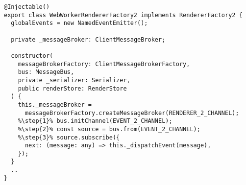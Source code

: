 \begin{verbatim}
@Injectable()
export class WebWorkerRendererFactory2 implements RendererFactory2 {
  globalEvents = new NamedEventEmitter();

  private _messageBroker: ClientMessageBroker;

  constructor(
    messageBrokerFactory: ClientMessageBrokerFactory,
    bus: MessageBus,
    private _serializer: Serializer,
    public renderStore: RenderStore
  ) {
    this._messageBroker =
      messageBrokerFactory.createMessageBroker(RENDERER_2_CHANNEL);
    %\step{1}% bus.initChannel(EVENT_2_CHANNEL);
    %\step{2}% const source = bus.from(EVENT_2_CHANNEL);
    %\step{3}% source.subscribe({
      next: (message: any) => this._dispatchEvent(message),
    });
  }
  ..
}
\end{verbatim}
